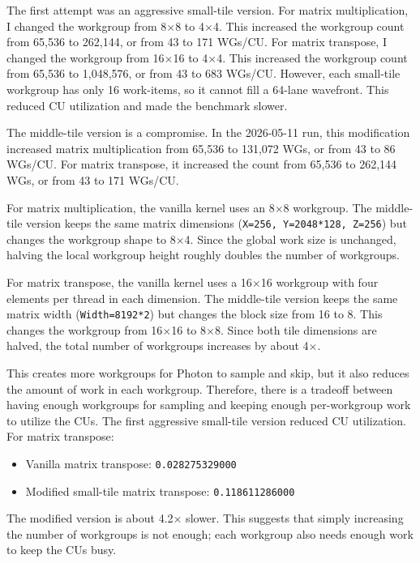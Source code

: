 \documentclass[11pt]{article}
\begin{document}
The first attempt was an aggressive small-tile version. For matrix
multiplication, I changed the workgroup from 8$\times$8 to 4$\times$4. This
increased the workgroup count from 65,536 to 262,144, or from 43 to 171 WGs/CU.
For matrix transpose, I changed the workgroup from 16$\times$16 to 4$\times$4.
This increased the workgroup count from 65,536 to 1,048,576, or from 43 to 683
WGs/CU. However, each small-tile workgroup has only 16 work-items, so it cannot
fill a 64-lane wavefront. This reduced CU utilization and made the benchmark
slower.

The middle-tile version is a compromise. In the 2026-05-11 run, this
modification increased matrix multiplication from 65,536 to 131,072 WGs, or
from 43 to 86 WGs/CU. For matrix transpose, it increased the count from 65,536
to 262,144 WGs, or from 43 to 171 WGs/CU.

For matrix multiplication, the vanilla kernel uses an 8$\times$8 workgroup. The
middle-tile version keeps the same matrix dimensions
(\texttt{X=256, Y=2048*128, Z=256}) but changes the workgroup shape to
8$\times$4. Since the global work size is unchanged, halving the local
workgroup height roughly doubles the number of workgroups.

For matrix transpose, the vanilla kernel uses a 16$\times$16 workgroup with four
elements per thread in each dimension. The middle-tile version keeps the same
matrix width (\texttt{Width=8192*2}) but changes the block size from 16 to 8.
This changes the workgroup from 16$\times$16 to 8$\times$8. Since both tile
dimensions are halved, the total number of workgroups increases by about
4$\times$.

This creates more workgroups for Photon to sample and skip, but it also reduces
the amount of work in each workgroup. Therefore, there is a tradeoff between
having enough workgroups for sampling and keeping enough per-workgroup work to
utilize the CUs. The first aggressive small-tile version reduced CU utilization.
For matrix transpose:

\begin{itemize}
  \item Vanilla matrix transpose: \texttt{0.028275329000}
  \item Modified small-tile matrix transpose: \texttt{0.118611286000}
\end{itemize}

The modified version is about 4.2$\times$ slower. This suggests that simply
increasing the number of workgroups is not enough; each workgroup also needs
enough work to keep the CUs busy.
\end{document}
